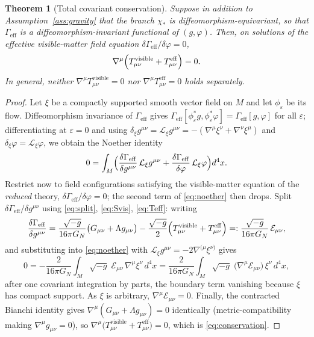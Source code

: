 \documentclass[11pt,reqno]{amsart}
\numberwithin{equation}{section}
\theoremstyle{plain}
\newtheorem{theorem}{Theorem}[section]
\theoremstyle{definition}
\theoremstyle{remark}
\newcommand{\Geff}{\Gamma_{\mathrm{eff}}}
\begin{document}
\begin{theorem}[Total covariant conservation]
\label{thm:conservation}
Suppose in addition to Assumption~\ref{ass:gravity} that the branch $\chi_{*}$ is
diffeomorphism-equivariant, so that $\Geff$ is a diffeomorphism-invariant functional of
$(g,\varphi)$. Then, \emph{on solutions of the effective visible-matter field equation}
$\delta\Geff/\delta\varphi=0$,
\begin{equation}
\label{eq:conservation}
\nabla^{\mu}\Bigl(T^{\mathrm{visible}}_{\mu\nu}+T^{\mathrm{eff}}_{\mu\nu}\Bigr)=0 .
\end{equation}
In general, neither $\nabla^{\mu}T^{\mathrm{visible}}_{\mu\nu}=0$ nor
$\nabla^{\mu}T^{\mathrm{eff}}_{\mu\nu}=0$ holds separately.
\end{theorem}

\begin{proof}
Let $\xi$ be a compactly supported smooth vector field on $M$ and let $\phi_{\varepsilon}$ be
its flow. Diffeomorphism invariance of $\Geff$ gives
$\Geff[\phi_{\varepsilon}^{*}g,\phi_{\varepsilon}^{*}\varphi]=\Geff[g,\varphi]$ for all
$\varepsilon$; differentiating at $\varepsilon=0$ and using
$\delta_{\xi}g^{\mu\nu}=\mathcal{L}_{\xi}g^{\mu\nu}=-(\nabla^{\mu}\xi^{\nu}+\nabla^{\nu}\xi^{\mu})$
and $\delta_{\xi}\varphi=\mathcal{L}_{\xi}\varphi$, we obtain the Noether identity
\begin{equation}
\label{eq:noether}
0=\int_{M}\Bigl(
\frac{\delta\Geff}{\delta g^{\mu\nu}}\,\mathcal{L}_{\xi}g^{\mu\nu}
+\frac{\delta\Geff}{\delta\varphi}\,\mathcal{L}_{\xi}\varphi
\Bigr)d^{4}x .
\end{equation}
Restrict now to field configurations satisfying the visible-matter equation of the
\emph{reduced} theory, $\delta\Geff/\delta\varphi=0$; the second term of \eqref{eq:noether}
then drops. Split $\delta\Geff/\delta g^{\mu\nu}$ using \eqref{eq:split}, \eqref{eq:Svis},
\eqref{eq:Teff}: writing
\[
\frac{\delta\Geff}{\delta g^{\mu\nu}}
=\frac{\sqrt{-g}}{16\pi G_{N}}\bigl(G_{\mu\nu}+\Lambda g_{\mu\nu}\bigr)
-\frac{\sqrt{-g}}{2}\Bigl(T^{\mathrm{visible}}_{\mu\nu}+T^{\mathrm{eff}}_{\mu\nu}\Bigr)
=:\frac{\sqrt{-g}}{16\pi G_{N}}\,\mathcal{E}_{\mu\nu},
\]
and substituting into \eqref{eq:noether} with
$\mathcal{L}_{\xi}g^{\mu\nu}=-2\nabla^{(\mu}\xi^{\nu)}$ gives
\[
0=-\frac{2}{16\pi G_{N}}\int_{M}\sqrt{-g}\;\mathcal{E}_{\mu\nu}\,\nabla^{\mu}\xi^{\nu}\,d^{4}x
=\frac{2}{16\pi G_{N}}\int_{M}\sqrt{-g}\;\bigl(\nabla^{\mu}\mathcal{E}_{\mu\nu}\bigr)\,\xi^{\nu}\,d^{4}x ,
\]
after one covariant integration by parts, the boundary term vanishing because $\xi$ has compact
support. As $\xi$ is arbitrary, $\nabla^{\mu}\mathcal{E}_{\mu\nu}=0$. Finally, the contracted
Bianchi identity gives $\nabla^{\mu}(G_{\mu\nu}+\Lambda g_{\mu\nu})=0$ identically
(metric-compatibility making $\nabla^{\mu}g_{\mu\nu}=0$), so
$\nabla^{\mu}\bigl(T^{\mathrm{visible}}_{\mu\nu}+T^{\mathrm{eff}}_{\mu\nu}\bigr)=0$, which is
\eqref{eq:conservation}.


\end{proof}
\end{document}
